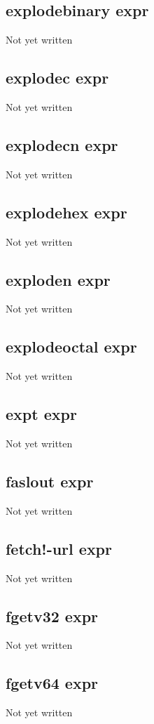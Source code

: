 \documentclass[a4paper,11pt]{article}
\begin{document}
\subsection{\ttfamily explodebinary expr}
Not yet written

\subsection{\ttfamily explodec expr}
Not yet written

\subsection{\ttfamily explodecn expr}
Not yet written

\subsection{\ttfamily explodehex expr}
Not yet written

\subsection{\ttfamily exploden expr}
Not yet written

\subsection{\ttfamily explodeoctal expr}
Not yet written

\subsection{\ttfamily expt expr}
Not yet written

\subsection{\ttfamily faslout expr}
Not yet written

\subsection{\ttfamily fetch!-url expr}
Not yet written

\subsection{\ttfamily fgetv32 expr}
Not yet written

\subsection{\ttfamily fgetv64 expr}
Not yet written
\end{document}
